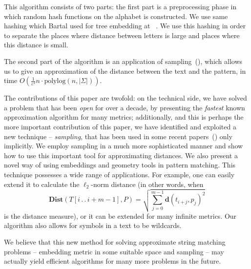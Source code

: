 \documentclass[11pt]{article}
\newcommand{\envert}[1]{\left\lvert#1\right\rvert}
\let\abs=\envert
\newcommand{\dist}{\textbf{d}}
\newcommand{\Dist}{\textbf{Dist}}
\begin{document}
This algorithm
 consists of two parts: the first part is a preprocessing phase in which
random hash functions on the alphabet is constructed. We use same
hashing which Bartal used for tree embedding at ~\cite{Bar96}. We
use this hashing in order to separate the places where distance
between letters is large and places where this distance is small.



 The second part of the algorithm is an application of sampling~(\cite{CPER07}),
which allows us to give an approximation of the distance between
the text and the pattern, in time $O(\frac{1}{\varepsilon^2}n\cdot
\mathrm{polylog}(n,\abs{\Sigma}))$.

The contributions of this paper are twofold: on the technical
side, we have solved a problem that has been {\em open} for over a
decade, by presenting the {\em fastest} known approximation
algorithm for many metrics; additionally, and this is perhaps the
more important contribution of this paper, we have identified and
exploited a new technique -- {\it sampling}, that has been used in
some recent papers~(\cite{CPER07}) only implicitly. We employ
sampling in a much more sophisticated manner and show how to use
this important tool for approximating distances. We also present a
novel way of using embeddings and geometry tools in pattern
matching. This technique possesses a wide range of applications.
For example, one can easily extend it to calculate the
$\ell_2$-norm distance (in other words, when
\begin{equation}
\Dist(T[i \,.\,.\, i+m-1],P)=\sqrt{\sum_{j=0}^{m-1}
\dist(t_{i+j},p_j)^2}
\end{equation}
is the distance measure), or it can be extended for many infinite
metrics. Our algorithm also allows for symbols in a text to be
wildcards.


We believe that this new method for solving approximate string matching
problems -- embedding metric in some suitable space and sampling
-- may actually yield efficient algorithms for many more problems in the future.
\end{document}
